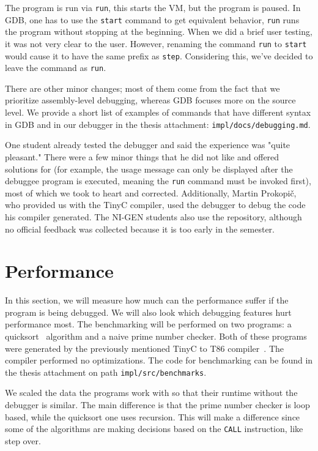 The program is run via \texttt{run}, this starts the VM, but the program is
paused. In GDB, one has to use the \texttt{start} command to get equivalent
behavior, \texttt{run} runs the program without stopping at the beginning. When
we did a brief user testing, it was not very clear to the user. However,
renaming the command \texttt{run} to \texttt{start} would cause it to have the
same prefix as \texttt{step}. Considering this, we've decided to leave the
command as \texttt{run}.

There are other minor changes; most of them come from the fact that we
prioritize assembly-level debugging, whereas GDB focuses more on the source
level. We provide a short list of examples of commands that have different
syntax in GDB and in our debugger in the thesis attachment:
\texttt{impl/docs/debugging.md}.

One student already tested the debugger and said the experience was "quite
pleasant." There were a few minor things that he did not like and offered
solutions for (for example, the usage message can only be displayed after the
debuggee program is executed, meaning the \texttt{run} command must be invoked
first), most of which we took to heart and corrected. Additionally, Martin
Prokopič, who provided us with the TinyC compiler, used the debugger to debug
the code his compiler generated. The NI-GEN students also use the repository,
although no official feedback was collected because it is too early in the
semester.

\section{Performance}\label{section:benchmark}
In this section, we will measure how much can the performance suffer if the
program is being debugged. We will also look which debugging features hurt
performance most. The benchmarking will be performed on two programs: a
quicksort~\cite{quicksort} algorithm and a naive prime number checker. Both of
these programs were generated by the previously mentioned TinyC to T86
compiler~\cite{martintinyc}. The compiler performed no optimizations. The code for
benchmarking can be found in the thesis attachment on path
\texttt{impl/src/benchmarks}.

We scaled the data the programs work with so that their runtime without the
debugger is similar. The main difference is that the prime number checker is
loop based, while the quicksort one uses recursion. This will make a difference
since some of the algorithms are making decisions based on the \texttt{CALL}
instruction, like step over.

